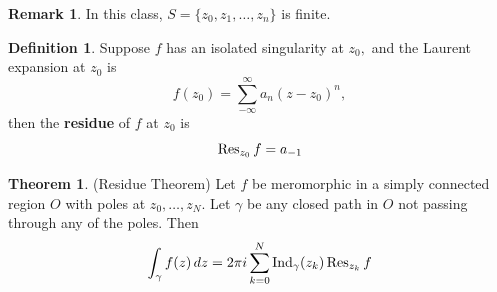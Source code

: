 \documentclass[10pt, oneside]{article}
\newcommand{\Ind}{\text{Ind}}
\theoremstyle{definition}
\newtheorem{thm}{Theorem}
\newtheorem{defn}{Definition}
\newtheorem{rem}{Remark}
\begin{document}
\begin{rem}
    In this class, $S = \{z_0, z_1, \dots, z_n\}$ is finite.
\end{rem}
\begin{defn}
    Suppose $f$ has an isolated singularity at $z_0,$ and the Laurent expansion at $z_0$ is 
    \[f(z_0) = \sum_{-\infty}^\infty a_n (z - z_0)^n,\] then the \textbf{residue} of $f$ at $z_0$ is 
    \[\Res_{z_0}{f} = a_{-1}\]
\end{defn}

\begin{thm}
(Residue Theorem)
Let $f$ be meromorphic in a simply connected region $O$ with poles at $z_0, \dots, z_N.$ Let $\gamma$ be any closed path in $O$ not passing through any of the poles. Then 
\[\int_\gamma f(z)\,dz = 2\pi i \sum_{k=0}^N \Ind_\gamma(z_k) \Res_{z_k}f\]
\end{thm}
\end{document}
